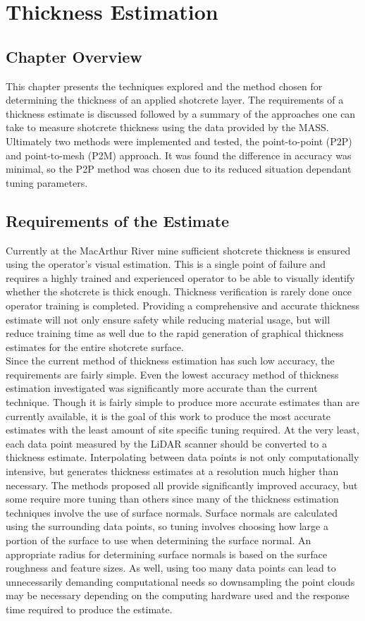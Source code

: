 \chapter{Thickness Estimation}
\label{chap:thick}
\section{Chapter Overview}
This chapter presents the techniques explored and the method chosen for determining the thickness of an applied shotcrete layer. The requirements of a thickness estimate is discussed followed by a summary of the approaches one can take to measure shotcrete thickness using the data provided by the MASS. Ultimately two methods were implemented and tested, the point-to-point (P2P) and point-to-mesh (P2M) approach. It was found the difference in accuracy was minimal, so the P2P method was chosen due to its reduced situation dependant tuning parameters.\\
\section{Requirements of the Estimate}
Currently at the MacArthur River mine sufficient shotcrete thickness is ensured using the operator's visual estimation. This is a single point of failure and requires a highly trained and experienced operator to be able to visually identify whether the shotcrete is thick enough. Thickness verification is rarely done once operator training is completed. Providing a comprehensive and accurate thickness estimate will not only ensure safety while reducing material usage, but will reduce training time as well due to the rapid generation of graphical thickness estimates for the entire shotcrete surface.\\

Since the current method of thickness estimation has such low accuracy, the requirements are fairly simple. Even the lowest accuracy method of thickness estimation investigated was significantly more accurate than the current technique. Though it is fairly simple to produce more accurate estimates than are currently available, it is the goal of this work to produce the most accurate estimates with the least amount of site specific tuning required. At the very least, each data point measured by the LiDAR scanner should be converted to a thickness estimate. Interpolating between data points is not only computationally intensive, but generates thickness estimates at a resolution much higher than necessary. The methods proposed all provide significantly improved accuracy, but some require more tuning than others since many of the thickness estimation techniques involve the use of surface normals. Surface normals are calculated using the surrounding data points, so tuning involves choosing how large a portion of the surface to use when determining the surface normal. An appropriate radius for determining surface normals is based on the surface roughness and feature sizes. As well, using too many data points can lead to unnecessarily demanding computational needs so downsampling the point clouds may be necessary depending on the computing hardware used and the response time required to produce the estimate.\\

